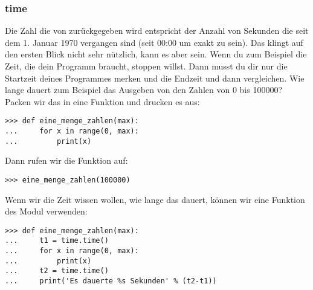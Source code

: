 \subsubsection*{time}
Die Zahl die von  zurückgegeben wird entspricht der Anzahl von Sekunden die seit dem 1. Januar 1970 vergangen sind (seit 00:00 um exakt zu sein). Das klingt auf den ersten Blick nicht sehr nützlich, kann es aber sein. Wenn du zum Beispiel die Zeit, die dein Programm braucht, stoppen willst. Dann musst du dir nur die Startzeit deines Programmes merken und die Endzeit und dann vergleichen. Wie lange dauert zum Beispiel das Ausgeben von den Zahlen von 0 bis 100000? Packen wir das in eine Funktion und drucken es aus:

\begin{Verbatim}[frame=single]
>>> def eine_menge_zahlen(max):
...     for x in range(0, max):
...         print(x)
\end{Verbatim}

\noindent
Dann rufen wir die Funktion auf:

\begin{Verbatim}[frame=single]
>>> eine_menge_zahlen(100000)
\end{Verbatim}

\noindent
Wenn wir die Zeit wissen wollen, wie lange das dauert, können wir eine Funktion des  Modul verwenden:

\begin{Verbatim}[frame=single]
>>> def eine_menge_zahlen(max):
...     t1 = time.time()
...     for x in range(0, max):
...         print(x)
...     t2 = time.time()
...     print('Es dauerte %s Sekunden' % (t2-t1))
\end{Verbatim}

